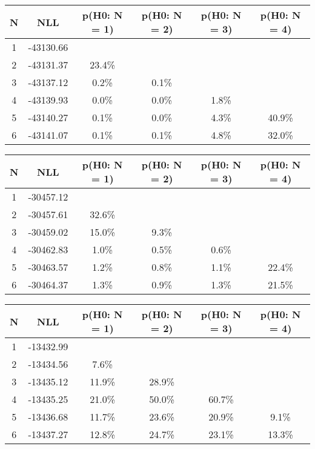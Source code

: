 \begin{table}[htb]
	\begin{center}
{\footnotesize\renewcommand{\arraystretch}{1.4}
		\begin{tabular}{cc||cccc}
			N & NLL & p(H0: N = 1) & p(H0: N = 2) & p(H0: N = 3) & p(H0: N = 4)\\ 
		\hline
1 & -43130.66 & & & & \\
2 & -43131.37 & 23.4\% & & & \\
3 & -43137.12 & 0.2\% & 0.1\% & & \\
4 & -43139.93 & 0.0\% & 0.0\% & 1.8\% & \\
5 & -43140.27 & 0.1\% & 0.0\% & 4.3\% & 40.9\% \\
6 & -43141.07 & 0.1\% & 0.1\% & 4.8\% & 32.0\% \\
	\end{tabular}
		\label{tab:lab}
	}
	\end{center}\end{table}

\begin{table}[htb]
	\begin{center}
{\footnotesize\renewcommand{\arraystretch}{1.4}
		\begin{tabular}{cc||cccc}
			N & NLL & p(H0: N = 1) & p(H0: N = 2) & p(H0: N = 3) & p(H0: N = 4)\\ 
		\hline
1 & -30457.12 & & & & \\
2 & -30457.61 & 32.6\% & & & \\
3 & -30459.02 & 15.0\% & 9.3\% & & \\
4 & -30462.83 & 1.0\% & 0.5\% & 0.6\% & \\
5 & -30463.57 & 1.2\% & 0.8\% & 1.1\% & 22.4\% \\
6 & -30464.37 & 1.3\% & 0.9\% & 1.3\% & 21.5\% \\
	\end{tabular}
		\label{tab:lab}
	}
	\end{center}\end{table}

\begin{table}[htb]
	\begin{center}
{\footnotesize\renewcommand{\arraystretch}{1.4}
		\begin{tabular}{cc||cccc}
			N & NLL & p(H0: N = 1) & p(H0: N = 2) & p(H0: N = 3) & p(H0: N = 4)\\ 
		\hline
1 & -13432.99 & & & & \\
2 & -13434.56 & 7.6\% & & & \\
3 & -13435.12 & 11.9\% & 28.9\% & & \\
4 & -13435.25 & 21.0\% & 50.0\% & 60.7\% & \\
5 & -13436.68 & 11.7\% & 23.6\% & 20.9\% & 9.1\% \\
6 & -13437.27 & 12.8\% & 24.7\% & 23.1\% & 13.3\% \\
	\end{tabular}
		\label{tab:lab}
	}
	\end{center}\end{table}

